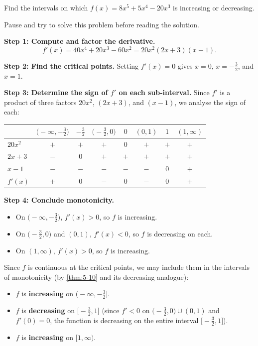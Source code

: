 \begin{example}
\label{ex:5-5}
Find the intervals on which $f(x) = 8x^{5} + 5x^{4} - 20x^{3}$ is increasing or decreasing.

\begin{remark}
Pause and try to solve this problem before reading the solution.
\end{remark}

\textbf{Step 1: Compute and factor the derivative.}
\[
  f'(x) = 40x^{4} + 20x^{3} - 60x^{2} = 20x^{2}(2x + 3)(x - 1).
\]

\textbf{Step 2: Find the critical points.}  Setting $f'(x) = 0$ gives $x = 0$, $x = -\frac{3}{2}$, and $x = 1$.

\textbf{Step 3: Determine the sign of $f'$ on each sub-interval.}  Since $f'$ is a product of three factors $20x^{2}$, $(2x+3)$, and $(x-1)$, we analyse the sign of each:

\begin{center}
\begin{tabular}{l|ccccccc}
  \toprule
  & $\bigl(-\infty,-\tfrac{3}{2}\bigr)$ & $-\frac{3}{2}$ & $\bigl(-\tfrac{3}{2},0\bigr)$ & $0$ & $(0,1)$ & $1$ & $(1,\infty)$ \\
  \midrule
  $20x^{2}$  & $+$ & $+$ & $+$ & $0$ & $+$ & $+$ & $+$ \\
  $2x+3$     & $-$ & $0$ & $+$ & $+$ & $+$ & $+$ & $+$ \\
  $x-1$      & $-$ & $-$ & $-$ & $-$ & $-$ & $0$ & $+$ \\
  \midrule
  $f'(x)$    & $+$ & $0$ & $-$ & $0$ & $-$ & $0$ & $+$ \\
  \bottomrule
\end{tabular}
\end{center}

\textbf{Step 4: Conclude monotonicity.}
\begin{itemize}
  \item On $\bigl(-\infty, -\frac{3}{2}\bigr)$, $f'(x) > 0$, so $f$ is increasing.
  \item On $\bigl(-\frac{3}{2}, 0\bigr)$ and $(0, 1)$, $f'(x) < 0$, so $f$ is decreasing on each.
  \item On $(1, \infty)$, $f'(x) > 0$, so $f$ is increasing.
\end{itemize}

Since $f$ is continuous at the critical points, we may include them in the intervals of monotonicity (by \cref{thm:5-10} and its decreasing analogue):
\begin{itemize}
  \item $f$ is \textbf{increasing} on $\bigl(-\infty, -\frac{3}{2}\bigr]$.
  \item $f$ is \textbf{decreasing} on $\bigl[-\frac{3}{2}, 1\bigr]$ (since $f'<0$ on $\bigl(-\frac{3}{2},0\bigr) \cup (0,1)$ and $f'(0) = 0$, the function is decreasing on the entire interval $\bigl[-\frac{3}{2},1\bigr]$).
  \item $f$ is \textbf{increasing} on $[1, \infty)$.
\end{itemize}


\end{example}
